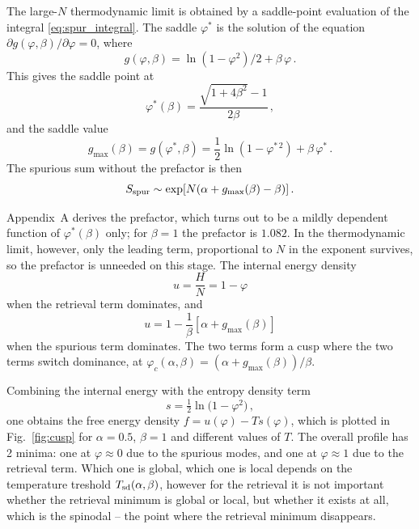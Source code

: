 \documentclass[letterpaper]{article} %
\newcommand{\Bnet}{\beta}
\newcommand{\p}{\partial}
\begin{document}
The large-$N$ thermodynamic limit is obtained by a saddle-point evaluation of the integral \eqref{eq:spur_integral}. 
The saddle $\varphi^*$ is the solution of the equation $\p g(\varphi, \Bnet)/\p\varphi = 0$,
where 
\begin{equation}
    g(\varphi, \Bnet) = \ln(1-\varphi^2)/2 + \Bnet\,\varphi\,.
\end{equation}
This gives the saddle point at
\begin{equation}
\varphi^*(\Bnet) = \frac{\sqrt{1+4\Bnet^2}-1}{2\Bnet}\,,
\label{eq:saddle}
\end{equation}  
and the saddle value
\begin{equation}
g_{\max}(\Bnet) = g(\varphi^*, \Bnet) = \frac12 \ln(1 - \varphi^{*\,2}) + \Bnet\,\varphi^*\,.
\label{eq:saddle_value}
\end{equation} 
The spurious sum without the prefactor is then
\begin{equation}
    S_{\rm spur} \sim \exp[N(\alpha + g_{\max}(\Bnet) - \Bnet)]\,.
    \label{eq:spurious_saddle}
\end{equation}

Appendix~A derives the prefactor, which turns out to be a mildly dependent 
function of $\varphi^*(\Bnet)$ only; for $\Bnet=1$ the prefactor is $1.082$. In the 
thermodynamic limit, however, only the leading term, proportional to $N$ in the exponent survives, 
so the prefactor is unneeded on this stage. The internal energy density
\begin{equation}
    u = \frac{H}{N} = 1 - \varphi
\end{equation}
when the retrieval term dominates, and 
\begin{equation}
    u = 1 - \frac{1}{\Bnet}[\alpha + g_{\max}(\Bnet)]
\end{equation}
when the spurious term dominates. The two terms form a cusp where 
the two terms switch dominance, at $\varphi_c(\alpha, \Bnet) = (\alpha + g_{\max}(\Bnet))/\Bnet$.

Combining the internal energy with the entropy density term~\citep{icml2026theory} 
\begin{equation}
    s = \tfrac{1}{2} \ln\Big( 1-\varphi^2 \Big)\,,
\end{equation}
one obtains the free energy density $f = u(\varphi) - Ts(\varphi)$, which is plotted in 
Fig.~\ref{fig:cusp} for $\alpha=0.5$, $\Bnet=1$ and different values of $T$. The overall profile has 2 minima:
one at $\varphi\approx 0$ due to the spurious modes, and one at $\varphi\approx 1$ due to the retrieval term. 
Which one is global, which one is local depends on the temperature treshold $T_{\rm sd}(\alpha, \Bnet)$, 
however for the retrieval it is not important whether the retrieval minimum is global or local, 
but whether it exists at all, which is the spinodal -- the point where the retrieval minimum disappears. 
\end{document}
